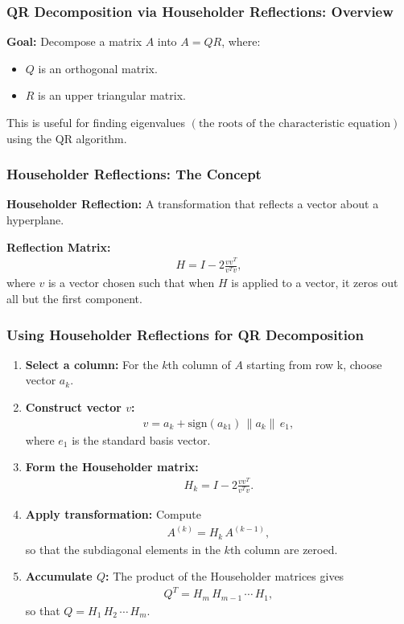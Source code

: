 \documentclass{beamer}
\providecommand{\brak}[1]{\ensuremath{\left(#1\right)}}
\theoremstyle{remark}
\providecommand{\norm}[1]{\lVert#1\rVert}
\numberwithin{equation}{section}
\begin{document}
\begin{frame}
\frametitle{QR Decomposition via Householder Reflections: Overview}
\textbf{Goal:} Decompose a matrix $A$ into $A = QR$, where:
\begin{itemize}
	\item $Q$ is an orthogonal matrix.
	\item $R$ is an upper triangular matrix.
\end{itemize}
  This is useful for finding eigenvalues \brak{\text{the roots of the characteristic equation}} using the QR algorithm.
\end{frame}

\begin{frame}
\frametitle{Householder Reflections: The Concept}
\textbf{Householder Reflection:} A transformation that reflects a vector about a hyperplane.

\textbf{Reflection Matrix:}
\begin{align}
H = I - 2\frac{vv^T}{v^T v},
\end{align}
where $v$ is a vector chosen such that when $H$ is applied to a vector, it zeros out all but the first component.
\end{frame}

\begin{frame}
\frametitle{Using Householder Reflections for QR Decomposition}
\begin{enumerate}
	\item \textbf{Select a column:} For the $k$th column of $A$ starting from row k, choose vector $a_k$.
	\item \textbf{Construct vector $v$:}
	\begin{align}
	v = a_k + \text{sign}\brak{a_{k1}}\,\norm{a_k}\,e_1,
	\end{align}
	where $e_1$ is the standard basis vector.
	\item \textbf{Form the Householder matrix:}
	\begin{align}
	H_k = I - 2\frac{vv^T}{v^T v}.
	\end{align}
	\item \textbf{Apply transformation:} Compute
	\begin{align}
    A^{\brak{k}} = H_k\,A^{\brak{k-1}},
	\end{align}
	so that the subdiagonal elements in the $k$th column are zeroed.
	\item \textbf{Accumulate $Q$:} The product of the Householder matrices gives
	\begin{align}
	Q^T = H_m\,H_{m-1}\,\cdots\,H_1,
	\end{align}
	so that $Q = H_1\,H_2\,\cdots\,H_m$.
\end{enumerate}

\end{frame}
\end{document}
